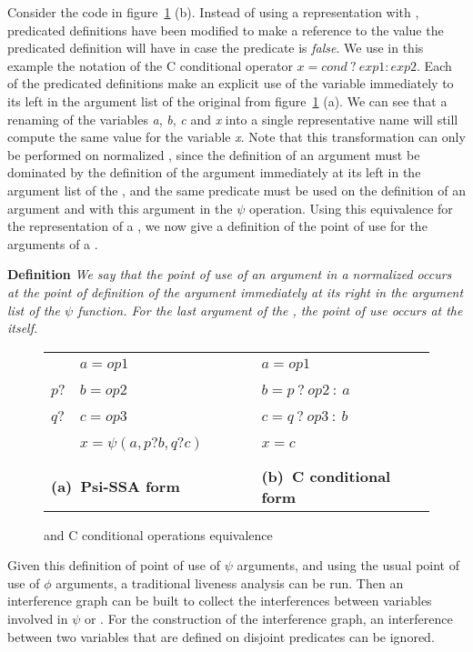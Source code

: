 Consider the code in figure~\ref{fig:psi_ccond} (b). Instead of using
a representation with \psifuns, predicated definitions have
been modified to make a reference to the value the predicated
definition will have in case the predicate is \textit{false}. We use in this
example the notation of the C conditional operator
${x = cond\ ?\ exp1 : exp2}$. Each of the predicated definitions make an
explicit use of the variable immediately to its left in the argument
list of the original \psifun from figure~\ref{fig:psi_ccond}
(a). We can see that a renaming of the variables \textit{a}, \textit{b},
\textit{c} and \textit{x} into a single representative name will still
compute the same value for the variable \textit{x}. Note that this
transformation can only be performed on normalized \psifuns,
since the definition of an argument must be dominated by the
definition of the argument immediately at its left in the argument
list of the \psifun, and the same predicate must be used on the
 definition of an argument and with this argument in the $\psi$ operation.
Using this equivalence for the
representation of a \psifun, we now give a definition of the
point of use for the arguments of a \psifun.

{\bf Definition} {\em We say that the point of use of an argument in a
  normalized \psifun occurs at the point of definition of the
  argument immediately at its right in the argument list of the $\psi$
  function. For the last argument of the \psifun, the point of
  use occurs at the \psifun itself. }

\begin{figure}
\begin{center}
\footnotesize
\begin{tabular}{llll}
           & ${a = op1}$ & \ \ \ \ & ${a = op1}$ \\
${p?}$ & ${b = op2}$ & \ \ \ \ & ${b = p\ ?\ op2\ :\ a}$ \\
${q?}$ & ${c = op3}$ & \ \ \ \ & ${c = q\ ?\ op3\ :\ b}$ \\
           & ${x = \psi(a,p?b,q?c)}$ & \ \ \ \ & ${x = c}$ \\
\\
\multicolumn{2}{l}{{\bf (a)\ Psi-SSA form}} & \ \ \ \ & {{\bf (b)\ C conditional form}}
\end{tabular}
\caption{\psifuns and C conditional operations equivalence}
\label{fig:psi_ccond}
\end{center}
\end{figure}

Given this definition of point of use of $\psi$ arguments, and using
the usual point of use of $\phi$ arguments, a traditional liveness
analysis can be run. Then an interference graph can be built to
collect the interferences between variables involved in $\psi$ or
\phifuns. For the construction of the interference graph, an
interference between two variables that are defined on disjoint
predicates can be ignored.

